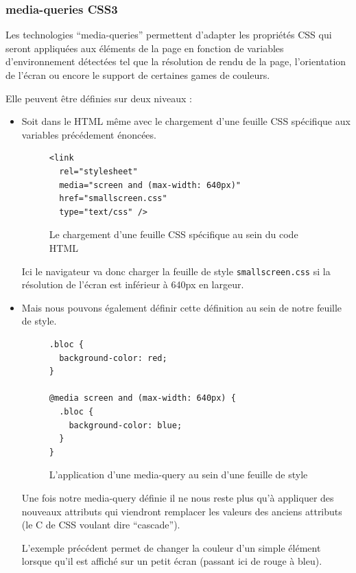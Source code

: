 \documentclass[12pt,a4paper]{book}
\begin{document}
\subsubsection{media-queries CSS3}

Les technologies ``media-queries'' permettent d'adapter les propriétés CSS qui seront appliquées aux éléments de la page en fonction de variables d'environnement détectées tel que la résolution de rendu de la page, l'orientation de l'écran ou encore le support de certaines games de couleurs.

Elle peuvent être définies sur deux niveaux :
\begin{itemize}
  \item Soit dans le HTML même avec le chargement d'une feuille CSS spécifique aux variables précédement énoncées.
  \begin{figure}[h]
  \lstset{language=html}
  \begin{lstlisting}
<link 
  rel="stylesheet" 
  media="screen and (max-width: 640px)" 
  href="smallscreen.css" 
  type="text/css" />
  \end{lstlisting}
   \caption{Le chargement d'une feuille CSS spécifique au sein du code HTML}
   \label{fig.sort3}
  \end{figure}
  
    Ici le navigateur va donc charger la feuille de style \texttt{smallscreen.css} si la résolution de l'écran est inférieur à 640px en largeur.
  \item Mais nous pouvons également définir cette définition au sein de notre feuille de style.
  
  \begin{figure}[h]
  \lstset{language=html}
  \begin{lstlisting}
.bloc {
  background-color: red;
}
  
@media screen and (max-width: 640px) {
  .bloc {
    background-color: blue;
  }
}
  \end{lstlisting}
   \caption{L'application d'une media-query au sein d'une feuille de style}
   \label{fig.sort3}
  \end{figure}
  
  Une fois notre media-query définie il ne nous reste plus qu'à appliquer des nouveaux attributs qui viendront remplacer les valeurs des anciens attributs (le C de CSS voulant dire ``cascade'').
  
  L'exemple précédent permet de changer la couleur d'un simple élément lorsque qu'il est affiché sur un petit écran (passant ici de rouge à bleu).

\end{itemize}
\end{document}
